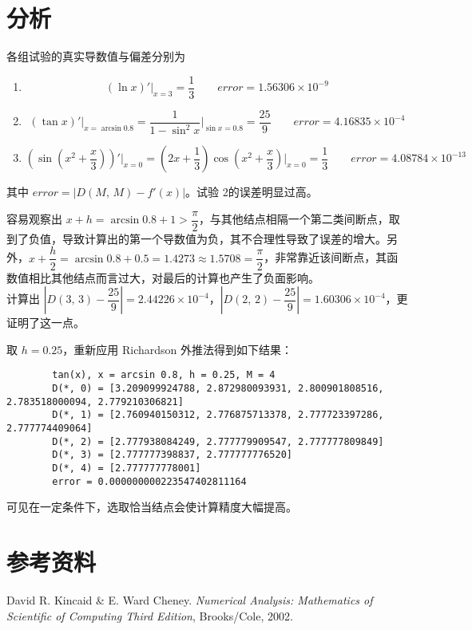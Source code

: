 \documentclass{ctexart}
\begin{document}
\section*{分析}
	各组试验的真实导数值与偏差分别为
	\begin{enumerate}
		\item $$(\ln x)'\Big\vert_{x = 3} = \dfrac{1}{3} \qquad error = 1.56306 \times 10^{-9}$$
		
		\item $$(\tan x)'\Big\vert_{x = \arcsin 0.8} = \dfrac{1}{1 - \sin^2 x}\Big\vert_{\sin x = 0.8} = \dfrac{25}{9} \qquad error = 4.16835 \times 10^{-4}$$
		
		\item $$\left(\sin(x^2 + \dfrac{x}{3})\right)'\Big\vert_{x = 0} = \left(2x + \dfrac{1}{3}\right)\cos(x^2 + \dfrac{x}{3})\Big\vert_{x = 0}  = \dfrac{1}{3} \qquad error = 4.08784 \times 10^{-13}$$
	\end{enumerate}
	其中 $error = |D(M,\,M) - f'(x)|$。试验 2的误差明显过高。
	
	容易观察出 $x + h = \arcsin 0.8 + 1> \dfrac{\pi}{2}$，与其他结点相隔一个第二类间断点，取到了负值，导致计算出的第一个导数值为负，其不合理性导致了误差的增大。另外，$x + \dfrac{h}{2} = \arcsin 0.8 + 0.5 = 1.4273 \approx 1.5708 = \dfrac{\pi}{2}$，非常靠近该间断点，其函数值相比其他结点而言过大，对最后的计算也产生了负面影响。\\
	
	计算出 $\left|D(3,\,3) - \dfrac{25}{9}\right| = 2.44226 \times 10^{-4}$，$\left|D(2,\,2)- \dfrac{25}{9}\right| = 1.60306 \times 10^{-4}$，更证明了这一点。
	
	取 $h = 0.25$，重新应用 Richardson 外推法得到如下结果：
	
	\begin{verbatim}
		tan(x), x = arcsin 0.8, h = 0.25, M = 4
		D(*, 0) = [3.209099924788, 2.872980093931, 2.800901808516, 2.783518000094, 2.779210306821]
		D(*, 1) = [2.760940150312, 2.776875713378, 2.777723397286, 2.777774409064]
		D(*, 2) = [2.777938084249, 2.777779909547, 2.777777809849]
		D(*, 3) = [2.777777398837, 2.777777776520]
		D(*, 4) = [2.777777778001]
		error = 0.000000000223547402811164
	\end{verbatim}
	可见在一定条件下，选取恰当结点会使计算精度大幅提高。
	
\section*{参考资料}
	\noindent [1] David R. Kincaid \& E. Ward Cheney. {\it Numerical Analysis: Mathematics of Scientific of Computing Third Edition}, Brooks/Cole, 2002.
\end{document}
